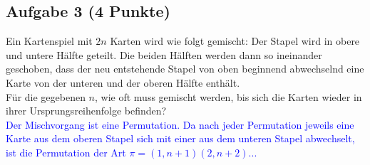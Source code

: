 \documentclass{article} %
\begin{document}
\subsection*{Aufgabe 3 (4 Punkte)}
Ein Kartenspiel mit $2n$ Karten wird wie folgt gemischt:
Der Stapel wird in obere und untere Hälfte geteilt. Die beiden Hälften werden dann so
ineinander geschoben, dass der neu entstehende Stapel von oben beginnend abwechselnd
eine Karte von der unteren und der oberen Hälfte enthält. \\
Für die gegebenen $n$, wie oft muss gemischt werden, bis sich die Karten wieder in ihrer
Ursprungsreihenfolge befinden? \\
\textcolor{Blue}{Der Mischvorgang ist eine Permutation. Da nach jeder Permutation jeweils eine Karte aus dem oberen Stapel sich mit einer aus dem unteren Stapel abwechselt, ist die Permutation der Art $\pi = (1,n+1)(2,n+2)...$}
\end{document}
